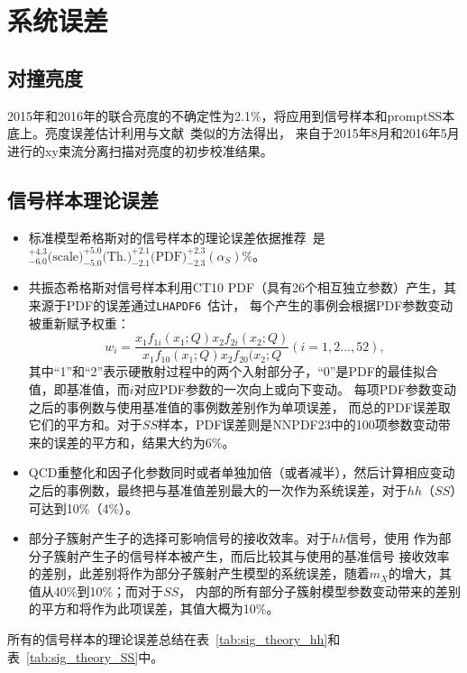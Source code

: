 \chapter{系统误差}\label{chap:4w_systematics}

\section{对撞亮度}
2015年和2016年的联合亮度的不确定性为2.1\%，将应用到信号样本和promptSS本底上。亮度误差估计利用与文献~\cite{DAPR-2013-01}类似的方法得出，
来自于2015年8月和2016年5月进行的xy束流分离扫描对亮度的初步校准结果。

\section{信号样本理论误差}
\begin{itemize}
 \item 标准模型希格斯对的信号样本的理论误差依据推荐~\cite{LHCdiHiggsXsec}是\\ 
 $^{+4.3}_{-6.0}\text{(scale)} ^{+5.0}_{-5.0}\text{(Th.)}  ^{+2.1}_{-2.1}\text{(PDF)} ^{+2.3}_{-2.3} (\alpha_S)$\%。
  \item 共振态希格斯对信号样本利用CT10 PDF（具有26个相互独立参数）产生，其来源于PDF的误差通过\texttt{LHAPDF6}~\cite{Buckley:2014ana}估计，
  每个产生的事例会根据PDF参数变动被重新赋予权重：\\
  \begin{equation}
w_{i}=\frac{x_1f_{1i}(x_1;Q) x_2f_{2i}(x_2;Q)}{x_1f_{10}(x_1;Q) x_2f_{20}(x_2;Q} (i=1,2...,52),
  \end{equation}
  其中``1''和``2''表示硬散射过程中的两个入射部分子，``0''是PDF的最佳拟合值，即基准值，而$i$对应PDF参数的一次向上或向下变动。
  每项PDF参数变动之后的事例数与使用基准值的事例数差别作为单项误差，
  而总的PDF误差取它们的平方和。对于$SS$样本，PDF误差则是NNPDF23中的100项参数变动带来的误差的平方和，结果大约为6\%。
   \item QCD重整化和因子化参数同时或者单独加倍（或者减半），然后计算相应变动之后的事例数，最终把与基准值差别最大的一次作为系统误差，对于$hh$（$SS$）可达到10\%（4\%）。
   \item 部分子簇射产生子的选择可影响信号的接收效率。对于$hh$信号，使用 作为部分子簇射产生子的信号样本被产生，而后比较其与使用\Herwigpp 的基准信号
   接收效率的差别，此差别将作为部分子簇射产生模型的系统误差，随着$m_X$的增大，其值从40\%到10\%；而对于$SS$， 内部的所有部分子簇射模型参数变动带来的差别
   的平方和将作为此项误差，其值大概为10\%。
\end{itemize}
所有的信号样本的理论误差总结在表~\ref{tab:sig_theory_hh}和表~\ref{tab:sig_theory_SS}中。



